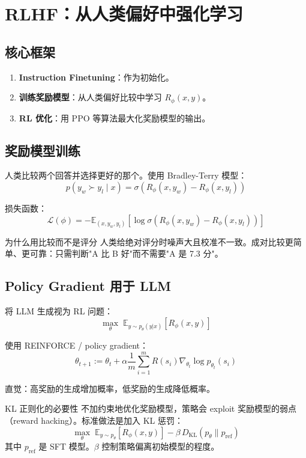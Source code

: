 \section{RLHF：从人类偏好中强化学习}

\subsection{核心框架}

\begin{enumerate}
    \item \textbf{Instruction Finetuning}：作为初始化。
    \item \textbf{训练奖励模型}：从人类偏好比较中学习 $R_\phi(x, y)$。
    \item \textbf{RL 优化}：用 PPO 等算法最大化奖励模型的输出。
\end{enumerate}

\subsection{奖励模型训练}

人类比较两个回答并选择更好的那个。使用 Bradley-Terry 模型：
$$p(y_w \succ y_l \mid x) = \sigma(R_\phi(x, y_w) - R_\phi(x, y_l))$$

损失函数：
$$\mathcal{L}(\phi) = -\mathbb{E}_{(x, y_w, y_l)}\left[\log \sigma(R_\phi(x, y_w) - R_\phi(x, y_l))\right]$$

\begin{knowledgebox}{为什么用比较而不是评分}
人类给绝对评分时噪声大且校准不一致。成对比较更简单、更可靠：只需判断"A 比 B 好"而不需要"A 是 7.3 分"。
\end{knowledgebox}

\subsection{Policy Gradient 用于 LLM}

将 LLM 生成视为 RL 问题：
$$\max_\theta \; \mathbb{E}_{y \sim p_\theta(y|x)} \left[R_\phi(x, y)\right]$$

使用 REINFORCE / policy gradient：
$$\theta_{t+1} := \theta_t + \alpha \frac{1}{m}\sum_{i=1}^{m} R(s_i) \nabla_{\theta_t} \log p_{\theta_t}(s_i)$$

直觉：高奖励的生成增加概率，低奖励的生成降低概率。

\begin{warningbox}{KL 正则化的必要性}
不加约束地优化奖励模型，策略会 exploit 奖励模型的弱点（reward hacking）。标准做法是加入 KL 惩罚：
$$\max_\theta \; \mathbb{E}_{y \sim p_\theta}\left[R_\phi(x, y)\right] - \beta \, D_{\mathrm{KL}}(p_\theta \| p_{\mathrm{ref}})$$
其中 $p_{\mathrm{ref}}$ 是 SFT 模型。$\beta$ 控制策略偏离初始模型的程度。
\end{warningbox}

